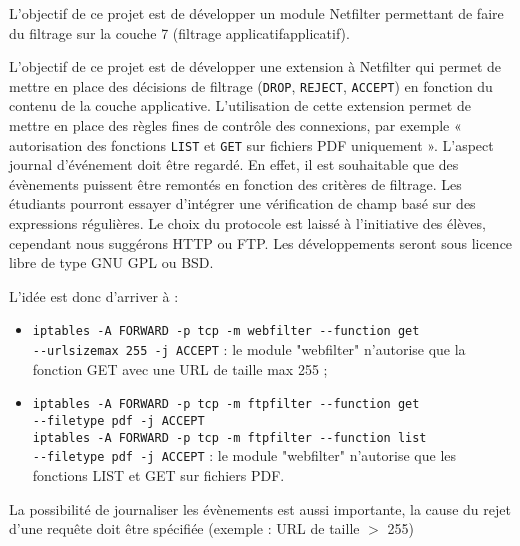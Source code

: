 L'objectif de ce projet est de développer un module Netfilter permettant de faire du filtrage sur la couche 7 (filtrage applicatifapplicatif).

L'objectif de ce projet est de développer une extension à Netfilter qui permet de mettre en place des décisions de filtrage (\verb+DROP+, \verb+REJECT+, \verb+ACCEPT+) en fonction du contenu de la couche applicative. L’utilisation de cette extension permet de mettre en place des règles fines de contrôle des connexions, par exemple « autorisation des fonctions \verb+LIST+ et \verb+GET+ sur fichiers PDF uniquement ». L’aspect journal d’événement doit être regardé. En effet, il est souhaitable que des évènements puissent être remontés en fonction des critères de filtrage. Les étudiants pourront essayer d’intégrer une vérification de champ basé sur des expressions régulières.
Le choix du protocole est laissé à l’initiative des élèves, cependant nous suggérons HTTP ou FTP.
Les développements seront sous licence libre de type GNU GPL ou BSD.

L'idée est donc d'arriver à :
\begin{itemize}
\item \verb+iptables -A FORWARD -p tcp -m webfilter --function get+\\ \verb+--urlsizemax 255 -j ACCEPT+ : le module "webfilter" n'autorise que la fonction GET avec une URL de taille max 255 ;
\item \verb+iptables -A FORWARD -p tcp -m ftpfilter --function get+\\
\verb+--filetype pdf -j ACCEPT+\\
\verb+iptables -A FORWARD -p tcp -m ftpfilter --function list+\\
\verb+--filetype pdf -j ACCEPT+ : le module "webfilter" n'autorise que les fonctions LIST et GET sur fichiers PDF.
\end{itemize}

La possibilité de journaliser les évènements est aussi importante, la cause du rejet d'une requête doit être spécifiée (exemple : URL de taille $>$ 255) 